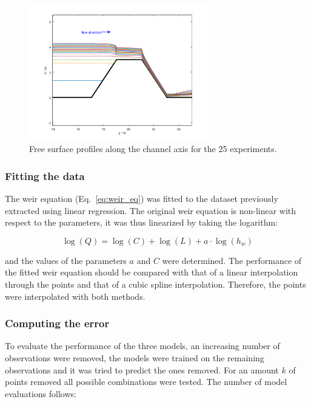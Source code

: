 \begin{figure}[h]
  \centering
  \includegraphics[width=0.7\textwidth]{Figures/free_surfaces.png}
  \caption{Free surface profiles along the channel axis for the \num{25} experiments.}
  \label{fig:free_surfaces}
\end{figure}


\subsubsection{Fitting the data}
The weir equation (Eq.~\ref{eq:weir_eq}) was fitted to the dataset previously extracted using linear regression.
The original weir equation is non-linear with respect to the parameters, it was thus linearized by taking the logarithm:

\begin{equation}
  \log(Q) = \log(C) + \log(L) + a \cdot \log(h_w)
\end{equation}

\noindent and the values of the parameters $a$ and $C$ were determined.
The performance of the fitted weir equation should be compared with that of a linear interpolation through the points and that of a cubic spline interpolation.
Therefore, the points were interpolated with both methods.


\subsubsection{Computing the error}\label{sec:compute_error}
To evaluate the performance of the three models, an increasing number of observations were removed, the models were trained on the remaining observations and it was tried to predict the ones removed.
For an amount $k$ of points removed all possible combinations were tested. The number of model evaluations follows:

